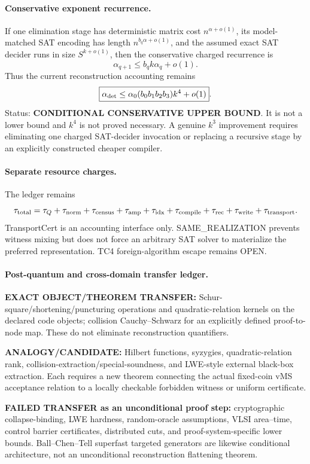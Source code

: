 \documentclass[11pt]{article}
\begin{document}
\paragraph{Conservative exponent recurrence.}
If one elimination stage has deterministic matrix cost $n^{\alpha+o(1)}$, its model-matched SAT encoding has length $n^{b_q\alpha+o(1)}$, and the assumed exact SAT decider runs in size $S^{k+o(1)}$, then the conservative charged recurrence is
\[\alpha_{q+1}\le b_q k\alpha_q+o(1).\]
Thus the current reconstruction accounting remains
\[
\boxed{\alpha_{\rm det}\le \alpha_0(b_0b_1b_2b_3)k^4+o(1)}.
\]
Status: \textbf{CONDITIONAL CONSERVATIVE UPPER BOUND}. It is not a lower bound and $k^4$ is not proved necessary. A genuine $k^3$ improvement requires eliminating one charged SAT-decider invocation or replacing a recursive stage by an explicitly constructed cheaper compiler.

\paragraph{Separate resource charges.}
The ledger remains
\[
\tau_{\rm total}=\tau_Q+\tau_{\rm norm}+\tau_{\rm census}+\tau_{\rm amp}+\tau_{\rm idx}+\tau_{\rm compile}+\tau_{\rm rec}+\tau_{\rm write}+\tau_{\rm transport}.
\]
TransportCert is an accounting interface only. SAME\_REALIZATION prevents witness mixing but does not force an arbitrary SAT solver to materialize the preferred representation. TC4 foreign-algorithm escape remains OPEN.

\paragraph{Post-quantum and cross-domain transfer ledger.}
\textbf{EXACT OBJECT/THEOREM TRANSFER:} Schur-square/shortening/puncturing operations and quadratic-relation kernels on the declared code objects; collision Cauchy--Schwarz for an explicitly defined proof-to-node map. These do not eliminate reconstruction quantifiers.

\textbf{ANALOGY/CANDIDATE:} Hilbert functions, syzygies, quadratic-relation rank, collision-extraction/special-soundness, and LWE-style external black-box extraction. Each requires a new theorem connecting the actual fixed-coin vMS acceptance relation to a locally checkable forbidden witness or uniform certificate.

\textbf{FAILED TRANSFER as an unconditional proof step:} cryptographic collapse-binding, LWE hardness, random-oracle assumptions, VLSI area--time, control barrier certificates, distributed cuts, and proof-system-specific lower bounds. Ball--Chen--Tell superfast targeted generators are likewise conditional architecture, not an unconditional reconstruction flattening theorem.
\end{document}
